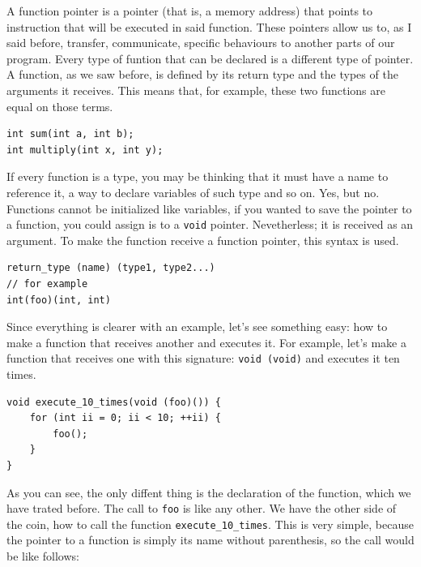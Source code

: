 \documentclass[a4paper]{article}
\begin{document}
A function pointer is a pointer (that is, a memory address) that points to
instruction that will be executed in said function. These pointers allow us to,
as I said before, transfer, communicate, specific behaviours to another parts of
our program. Every type of funtion that can be declared is a different type of
pointer. A function, as we saw before, is defined by its return type and the
types of the arguments it receives. This means that, for example, these two
functions are equal on those terms.

\noindent
\begin{minipage}[H]{\linewidth}
\begin{lstlisting}[style=C]
int sum(int a, int b);
int multiply(int x, int y);
\end{lstlisting}
\end{minipage}

If every function is a type, you may be thinking that it must have a name to
reference it, a way to declare variables of such type and so on.
Yes, but no. Functions cannot
be initialized like variables, if you wanted to save the pointer to a function,
you could assign is to a \verb!void! pointer. Nevetherless; it is received
as an argument. To make the function receive a function pointer, this syntax is
used.

\noindent
\begin{minipage}[H]{\linewidth}
\begin{lstlisting}[style=C]
return_type (name) (type1, type2...)
// for example
int(foo)(int, int)
\end{lstlisting}
\end{minipage}

Since everything is clearer with an example, let's see something easy: how to
make a function that receives another and executes it. For example, let's make
a function that receives one with this signature:
\lstinline[style=C]!void (void)! and executes it ten times.

\noindent
\begin{minipage}[H]{\linewidth}
\begin{lstlisting}[style=C, label={lst:argumentFoo},
caption={First example of function pointer argument}]
void execute_10_times(void (foo)()) {
    for (int ii = 0; ii < 10; ++ii) {
        foo();
    }
}
\end{lstlisting}
\end{minipage}

As you can see, the only diffent thing is the declaration of the function, which
we have trated before. The call to \verb!foo! is like any other. We have the
other side of the coin, how to call the function \verb!execute_10_times!. This
is very simple, because the pointer to a function is simply its name without
parenthesis, so the call would be like follows:
\end{document}
